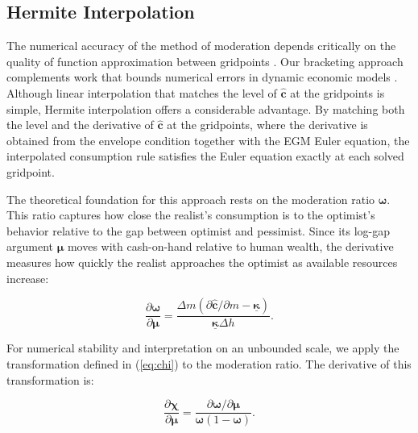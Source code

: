 \documentclass[twocolumn, switch]{article}
\newcommand{\mNrm}{m}
\newcommand{\cFunc}{\mathbf{c}}
\newcommand{\hNrm}{h}
\newcommand{\MPC}{\boldsymbol{\kappa}}
\newcommand{\MPCmin}{\underline{\MPC}}
\newcommand{\logmNrmEx}{\boldsymbol{\mu}}
\newcommand{\modRte}{\boldsymbol{\omega}}
\newcommand{\mNrmEx}{\Delta \mNrm}
\newcommand{\hNrmEx}{\Delta \hNrm}
\newcommand{\cFuncReal}{\hat{\cFunc}}
\newcommand{\logitModRte}{\boldsymbol{\chi}}
\begin{document}
\subsection{Hermite Interpolation}

The numerical accuracy of the method of moderation depends critically on the quality of function approximation between gridpoints \citep{Santos2000}. Our bracketing approach complements work that bounds numerical errors in dynamic economic models \citep{JuddMaliarMaliar2017}. Although linear interpolation that matches the level of $\cFuncReal$ at the gridpoints is simple, Hermite interpolation \citep{Fritsch1980, FritschButland1984, Hyman1983} offers a considerable advantage. By matching both the level and the derivative of $\cFuncReal$ at the gridpoints, where the derivative is obtained from the envelope condition \citep{BenvenisteScheinkman1979, MilgromSegal2002} together with the EGM Euler equation, the interpolated consumption rule satisfies the Euler equation exactly at each solved gridpoint.

The theoretical foundation for this approach rests on the moderation ratio $\modRte$. This ratio captures how close the realist's consumption is to the optimist's behavior relative to the gap between optimist and pessimist. Since its log-gap argument $\logmNrmEx$ moves with cash-on-hand relative to human wealth, the derivative measures how quickly the realist approaches the optimist as available resources increase:

\begin{equation}
\label{eq:modRteMu}
\frac{\partial \modRte}{\partial \logmNrmEx} = \frac{\mNrmEx (\partial \cFuncReal/\partial \mNrm - \MPCmin)}{\MPCmin \hNrmEx}.
\end{equation}

For numerical stability and interpretation on an unbounded scale, we apply the transformation defined in (\ref{eq:chi}) to the moderation ratio. The derivative of this transformation is:

\begin{equation}
\label{eq:logitModRteMu}
\frac{\partial \logitModRte}{\partial \logmNrmEx} = \frac{\partial \modRte / \partial \logmNrmEx}{\modRte(1 - \modRte)}.
\end{equation}
\end{document}
